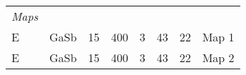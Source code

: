 \begin{table}[phtb]
\begin{center}
\begin{tabular}{lllllllp{3.5cm}}
            \hline
            \emph{Maps}                &                 &                &                &             &              &             &                     \\
            E                          & GaSb            & 15             & 400            & 3           & 43           & 22          & Map 1               \\
            E                          & GaSb            & 15             & 400            & 3           & 43           & 22          & Map 2               \\
            \hline
        \end{tabular}
    \end{center}
\end{table}
